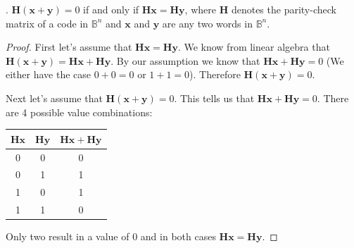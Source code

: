 \documentclass[twoside]{amsart}
\begin{document}
\begin{enumerate}[A.]
   . $\mathbf{H}(\mathbf{x}+\mathbf{y})=0$ if and only
   if $\mathbf{Hx}=\mathbf{Hy}$, where $\mathbf{H}$ denotes the parity-check
   matrix of a code in $\mathbb{B}^n$ and $\mathbf{x}$ and $\mathbf{y}$
   are any two words in $\mathbb{B}^n$.

   \begin{proof}
   First let's assume that $\mathbf{Hx}=\mathbf{Hy}$. We know
   from linear algebra that $\mathbf{H}(\mathbf{x}+\mathbf{y})=
   \mathbf{Hx}+\mathbf{Hy}$. By our assumption we know that
   $\mathbf{Hx}+\mathbf{Hy}=0$ (We either have the case $0+0=0$
   or $1+1=0$). Therefore $\mathbf{H}(\mathbf{x}+\mathbf{y})
   =0$.

   Next let's assume that $\mathbf{H}(\mathbf{x}+\mathbf{y})=0$. This
   tells us that $\mathbf{Hx}+\mathbf{Hy}=0$. There are 4 possible
   value combinations:
   \begin{center}
   \begin{tabular}{cc|c}
   $\mathbf{Hx}$ & $\mathbf{Hy}$ & $\mathbf{Hx}+\mathbf{Hy}$ \\\hline
   0 & 0 & 0 \\
   0 & 1 & 1 \\
   1 & 0 & 1 \\
   1 & 1 & 0
   \end{tabular}
   \end{center}
   Only two result in a value of 0 and in both cases $
   \mathbf{Hx}=\mathbf{Hy}$.
   \end{proof}






\end{enumerate}
\end{document}
